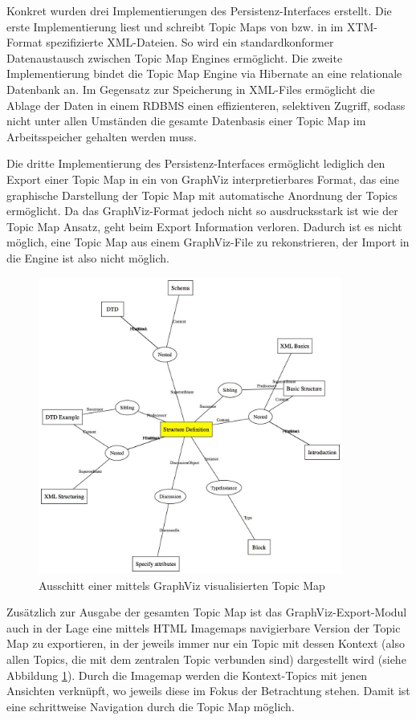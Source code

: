 Konkret wurden drei Implementierungen des Persistenz-Interfaces erstellt. Die erste Implementierung liest und schreibt Topic Maps von bzw. in im \gls{XTM}-Format \citep{XTM06} spezifizierte \gls{XML}-Dateien. So wird ein standardkonformer Datenaustausch zwischen Topic Map Engines ermöglicht. Die zweite Implementierung bindet die Topic Map Engine via Hibernate \citep{Hibernate07} an eine relationale Datenbank an. Im Gegensatz zur Speicherung in \gls{XML}-Files ermöglicht die Ablage der Daten in einem \gls{RDBMS} einen effizienteren, selektiven Zugriff, sodass nicht unter allen Umständen die gesamte Datenbasis einer Topic Map im Arbeitsspeicher gehalten werden muss.

Die dritte Implementierung des Persistenz-Interfaces ermöglicht lediglich den Export einer Topic Map in ein von GraphViz \citep{Ellson02} interpretierbares Format, das eine graphische Darstellung der Topic Map mit automatische Anordnung der Topics ermöglicht. Da das GraphViz-Format jedoch nicht so ausdrucksstark ist wie der Topic Map Ansatz, geht beim Export Information verloren. Dadurch ist es nicht möglich, eine Topic Map aus einem GraphViz-File zu rekonstrieren, der Import in die Engine ist also nicht möglich. 

\begin{figure}[htbp]
	\centering
		\includegraphics[width=10cm]{img/Persistenz/GraphVizExample.jpg}
	\caption{Ausschitt einer mittels GraphViz visualisierten Topic Map}
	\label{fig:img_Persistenz_GraphViz}
\end{figure}

Zusätzlich zur Ausgabe der gesamten Topic Map ist das GraphViz-Export-Modul auch in der Lage eine mittels HTML Imagemaps navigierbare Version der Topic Map zu exportieren, in der jeweils immer nur ein Topic mit dessen Kontext (also allen Topics, die mit dem zentralen Topic verbunden sind) dargestellt wird (siehe Abbildung \ref{fig:img_Persistenz_GraphViz}). Durch die Imagemap werden die Kontext-Topics mit jenen Ansichten verknüpft, wo jeweils diese im Fokus der Betrachtung stehen. Damit ist eine schrittweise Navigation durch die Topic Map möglich.

